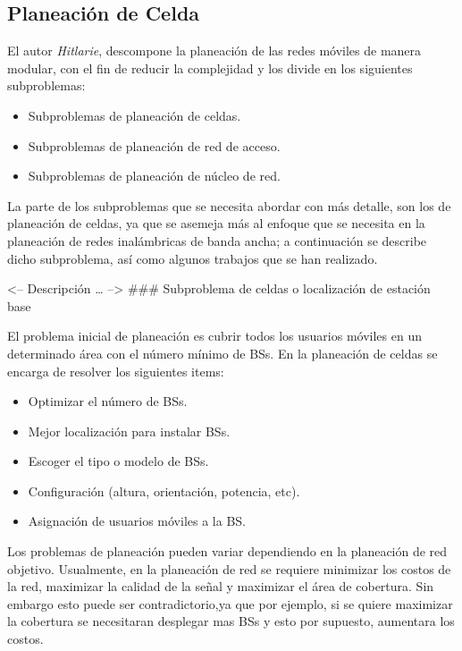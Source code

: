 \documentclass[]{article}
\providecommand{\tightlist}{%
  \setlength{\itemsep}{0pt}\setlength{\parskip}{0pt}}
\begin{document}
\subsection{Planeación de Celda}\label{planeaciuxf3n-de-celda}

El autor \emph{Hitlarie}, descompone la planeación de las redes móviles
de manera modular, con el fin de reducir la complejidad y los divide en
los siguientes subproblemas:

\begin{itemize}
\tightlist
\item
  Subproblemas de planeación de celdas.
\item
  Subproblemas de planeación de red de acceso.
\item
  Subproblemas de planeación de núcleo de red.
\end{itemize}

La parte de los subproblemas que se necesita abordar con más detalle,
son los de planeación de celdas, ya que se asemeja más al enfoque que se
necesita en la planeación de redes inalámbricas de banda ancha; a
continuación se describe dicho subproblema, así como algunos trabajos
que se han realizado.

\textless{}-- Descripción \ldots{} --\textgreater{} \#\#\# Subproblema
de celdas o localización de estación base

El problema inicial de planeación es cubrir todos los usuarios móviles
en un determinado área con el número mínimo de BSs. En la planeación de
celdas se encarga de resolver los siguientes items:

\begin{itemize}
\tightlist
\item
  Optimizar el número de BSs.
\item
  Mejor localización para instalar BSs.
\item
  Escoger el tipo o modelo de BSs.
\item
  Configuración (altura, orientación, potencia, etc).
\item
  Asignación de usuarios móviles a la BS.
\end{itemize}

Los problemas de planeación pueden variar dependiendo en la planeación
de red objetivo. Usualmente, en la planeación de red se requiere
minimizar los costos de la red, maximizar la calidad de la señal y
maximizar el área de cobertura. Sin embargo esto puede ser
contradictorio,ya que por ejemplo, si se quiere maximizar la cobertura
se necesitaran desplegar mas BSs y esto por supuesto, aumentara los
costos.
\end{document}
